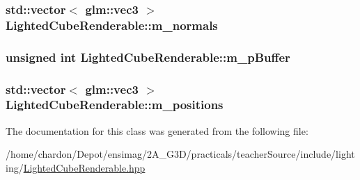 \hypertarget{classLightedCubeRenderable_af2d85e3194b02e6f94004f0cd08195f9}{
\subsubsection[{m\+\_\+normals}]{\setlength{\rightskip}{0pt plus 5cm}std\+::vector$<$ glm\+::vec3 $>$ Lighted\+Cube\+Renderable\+::m\+\_\+normals\hspace{0.3cm}{\ttfamily [private]}}}\label{classLightedCubeRenderable_af2d85e3194b02e6f94004f0cd08195f9}
\hypertarget{classLightedCubeRenderable_a9454b080496e7ceb563615c1fa14be9b}{
\subsubsection[{m\+\_\+p\+Buffer}]{\setlength{\rightskip}{0pt plus 5cm}unsigned int Lighted\+Cube\+Renderable\+::m\+\_\+p\+Buffer\hspace{0.3cm}{\ttfamily [private]}}}\label{classLightedCubeRenderable_a9454b080496e7ceb563615c1fa14be9b}
\hypertarget{classLightedCubeRenderable_a0c0c5eb370f23cabfd1a683d784559af}{
\subsubsection[{m\+\_\+positions}]{\setlength{\rightskip}{0pt plus 5cm}std\+::vector$<$ glm\+::vec3 $>$ Lighted\+Cube\+Renderable\+::m\+\_\+positions\hspace{0.3cm}{\ttfamily [private]}}}\label{classLightedCubeRenderable_a0c0c5eb370f23cabfd1a683d784559af}


The documentation for this class was generated from the following file\+:\begin{DoxyCompactItemize}
\item 
/home/chardon/\+Depot/ensimag/2\+A\+\_\+\+G3\+D/practicals/teacher\+Source/include/lighting/\hyperlink{LightedCubeRenderable_8hpp}{Lighted\+Cube\+Renderable.\+hpp}\end{DoxyCompactItemize}
